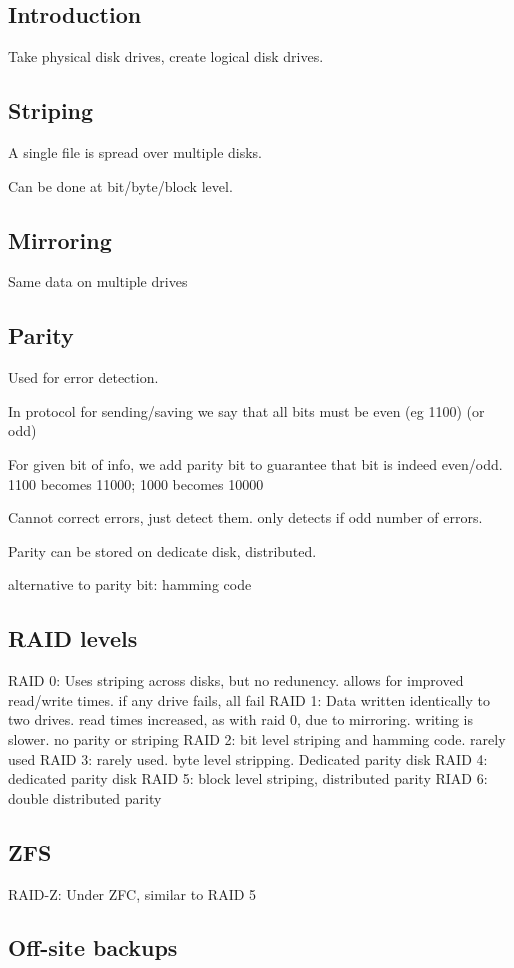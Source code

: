 
\subsection{Introduction}

Take physical disk drives, create logical disk drives.

\subsection{Striping}

A single file is spread over multiple disks.

Can be done at bit/byte/block level.

\subsection{Mirroring}

Same data on multiple drives

\subsection{Parity}

Used for error detection.

In protocol for sending/saving we say that all bits must be even (eg 1100) (or odd)

For given bit of info, we add parity bit to guarantee that bit is indeed even/odd. 1100 becomes 11000; 1000 becomes 10000

Cannot correct errors, just detect them. only detects if odd number of errors.

Parity can be stored on dedicate disk, distributed.

alternative to parity bit: hamming code

\subsection{RAID levels}

RAID 0: Uses striping across disks, but no redunency. allows for improved read/write times. if any drive fails, all fail
RAID 1: Data written identically to two drives. read times increased, as with raid 0, due to mirroring. writing is slower. no parity or striping
RAID 2: bit level striping and hamming code. rarely used
RAID 3: rarely used. byte level stripping. Dedicated parity disk
RAID 4: dedicated parity disk
RAID 5: block level striping, distributed parity
RIAD 6: double distributed parity

\subsection{ZFS}

RAID-Z: Under ZFC, similar to RAID 5

\subsection{Off-site backups}

